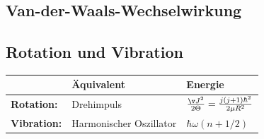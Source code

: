 \documentclass[twocolumn]{summery_4.1}
\begin{document}
\subsection{Van-der-Waals-Wechselwirkung}

\subsection{Rotation und Vibration}
\begin{center}
\begin{tabular}[0.49\textwidth]{@{}lll@{}}
    \toprule
    & Äquivalent & Energie \\
    \midrule
    {\bf Rotation:} & Drehimpuls & \(\frac{\v J^2}{2\Theta} = \frac{j(j+1)\hbar^2}{2\mu R^2}\)\\
    {\bf Vibration:} & Harmonischer Oszillator & \(\hbar\omega(n+1/2)\)\\
    \bottomrule
\end{tabular}
\end{center}
\end{document}
